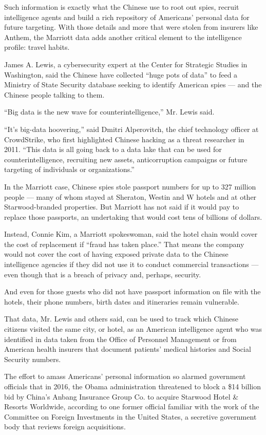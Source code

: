 Such information is exactly what the Chinese use to root out spies,
recruit intelligence agents and build a rich repository of Americans'
personal data for future targeting. With those details and more that
were stolen from insurers like Anthem, the Marriott data adds another
critical element to the intelligence profile: travel habits.

James A. Lewis, a cybersecurity expert at the Center for Strategic
Studies in Washington, said the Chinese have collected ``huge pots of
data'' to feed a Ministry of State Security database seeking to identify
American spies --- and the Chinese people talking to them.

``Big data is the new wave for counterintelligence,'' Mr. Lewis said.

``It's big-data hoovering,'' said Dmitri Alperovitch, the chief
technology officer at CrowdStrike, who first highlighted Chinese hacking
as a threat researcher in 2011. ``This data is all going back to a data
lake that can be used for counterintelligence, recruiting new assets,
anticorruption campaigns or future targeting of individuals or
organizations.''

In the Marriott case, Chinese spies stole passport numbers for up to 327
million people --- many of whom stayed at Sheraton, Westin and W hotels
and at other Starwood-branded properties. But Marriott has not said if
it would pay to replace those passports, an undertaking that would cost
tens of billions of dollars.

Instead, Connie Kim, a Marriott spokeswoman, said the hotel chain would
cover the cost of replacement if ``fraud has taken place.'' That means
the company would not cover the cost of having exposed private data to
the Chinese intelligence agencies if they did not use it to conduct
commercial transactions --- even though that is a breach of privacy and,
perhaps, security.

And even for those guests who did not have passport information on file
with the hotels, their phone numbers, birth dates and itineraries remain
vulnerable.

That data, Mr. Lewis and others said, can be used to track which Chinese
citizens visited the same city, or hotel, as an American intelligence
agent who was identified in data taken from the Office of Personnel
Management or from American health insurers that document patients'
medical histories and Social Security numbers.

The effort to amass Americans' personal information so alarmed
government officials that in 2016, the Obama administration threatened
to block a \$14 billion bid by China's Anbang Insurance Group Co. to
acquire Starwood Hotel \& Resorts Worldwide, according to one former
official familiar with the work of the Committee on Foreign Investments
in the United States, a secretive government body that reviews foreign
acquisitions.

